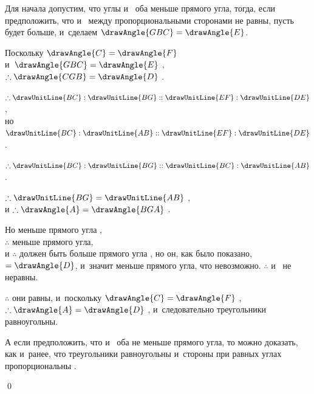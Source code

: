 \documentclass[letters,booklanguage=russian]{byrnebook}
\begin{document}
\begin{center}
Для начала допустим, что углы  и~ оба меньше прямого угла, тогда, если предположить, что  и~ между пропорциональными сторонами не равны, пусть  будет больше, и~сделаем $\drawAngle{GBC} = \drawAngle{E}$.

Поскольку $\drawAngle{C} = \drawAngle{F}$ \byref{\hypref}\\
и~$\drawAngle{GBC} = \drawAngle{E}$ \byref{\constref},\\
$\therefore \drawAngle{CGB} = \drawAngle{D}$ .

$\therefore \drawUnitLine{BC} : \drawUnitLine{BG} :: \drawUnitLine{EF} : \drawUnitLine{DE}$ ,\\
но $\drawUnitLine{BC} : \drawUnitLine{AB} :: \drawUnitLine{EF} : \drawUnitLine{DE}$ \byref{\hypref}.

$\therefore \drawUnitLine{BC} : \drawUnitLine{BG} :: \drawUnitLine{BC} : \drawUnitLine{AB}$.

$\therefore \drawUnitLine{BG} = \drawUnitLine{AB}$ ,\\
и $\therefore \drawAngle{A} = \drawAngle{BGA}$ .

Но  меньше прямого угла \byref{\hypref},\\
$\therefore$  меньше прямого угла,\\
и $\therefore$  должен быть больше прямого угла , но он, как было показано, $= \drawAngle{D}$, и~значит меньше прямого угла, что невозможно. $\therefore$  и~ не неравны.

$\therefore$ они равны, и~поскольку $\drawAngle{C} = \drawAngle{F}$ \byref{\hypref},\\
$\therefore \drawAngle{A} = \drawAngle{D}$ , и~следовательно треугольники равноугольны.
\end{center}

А если предположить, что  и~ оба не меньше прямого угла, то можно доказать, как и~ранее, что треугольники равноугольны и~стороны при равных углах пропорциональны .

\qed
\end{document}
